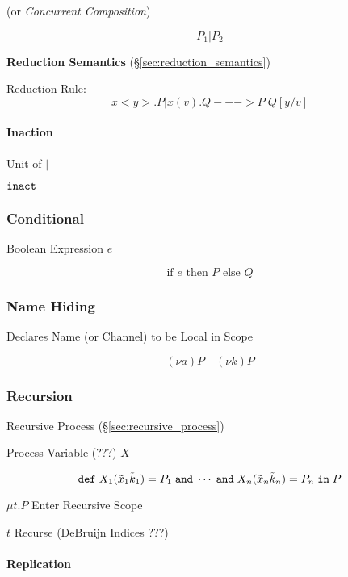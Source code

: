 (or \emph{Concurrent Composition})

\[
  P_1 | P_2
\]


\textbf{Reduction Semantics} (\S\ref{sec:reduction_semantics})

Reduction Rule:
\[
  x<y>.P | x(v).Q ---> P | Q[y/v]
\]



\paragraph{Inaction}\label{sec:inaction}\hfill

Unit of $|$

$\mathtt{inact}$



\subsubsection{Conditional}\label{sec:conditional}

Boolean Expression $e$

\[
  \text{if } e \text{ then } P \text{ else } Q
\]



\subsubsection{Name Hiding}\label{sec:name_hiding}

Declares Name (or Channel) to be Local in Scope

\[
  (\nu a)P \quad (\nu k)P
\]



\subsubsection{Recursion}\label{sec:process_recursion}

Recursive Process (\S\ref{sec:recursive_process})

Process Variable (???) $X$

\[
  \mathtt{def} \; X_1(\tilde{x}_1 \tilde{k}_1)
  = P_1 \; \mathtt{and} \; \cdots \; \mathtt{and} \;
  X_n(\tilde{x}_n \tilde{k}_n) = P_n \; \mathtt{in} \; P
\]

$\mu t.P$ Enter Recursive Scope

$t$ Recurse (DeBruijn Indices ???) %



\paragraph{Replication}\label{sec:replication}\hfill

